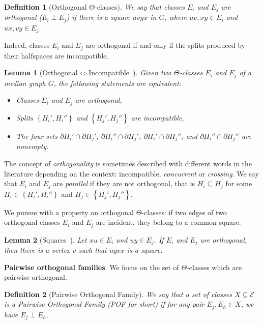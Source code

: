 \documentclass{article}
\newtheorem{definition}{Definition}
\newtheorem{lemma}{Lemma}
\newcommand{\set}[1]{\left\{ #1 \right\}}
\begin{document}
\begin{definition}[Orthogonal $\Theta$-classes]
We say that classes $E_i$ and $E_j$ are {\em orthogonal} ($E_i \perp E_j$) if there is a square $uvyx$ in $G$, where $uv,xy \in E_i$ and $ux,vy \in E_j$.
\end{definition}

Indeed, classes $E_i$ and $E_j$ are orthogonal if and only if the splits produced by their halfspaces are incompatible.

\begin{lemma}[Orthogonal$\Leftrightarrow$Incompatible~\cite{BeHa21}] Given two $\Theta$-classes $E_i$ and $E_j$ of a median graph $G$, the following statements are equivalent:
\begin{itemize}
    \item Classes $E_i$ and $E_j$ are orthogonal,
    \item Splits $\set{H_i',H_i''}$ and $\set{H_j',H_j''}$ are incompatible,
    \item The four sets $\partial H_i' \cap \partial H_j'$, $\partial H_i'' \cap \partial H_j'$, $\partial H_i' \cap \partial H_j''$, and $\partial H_i'' \cap \partial H_j''$ are nonempty.
\end{itemize}
\label{le:perp_incomp}
\end{lemma}

The concept of \textit{orthogonality} is sometimes described with different words in the literature depending on the context: incompatible, \textit{concurrent} or \textit{crossing}. We say that $E_i$ and $E_j$ are \textit{parallel} if they are not orthogonal, that is $H_i \subseteq H_j$ for some $H_i \in \set{H_i',H_i''}$ and $H_j \in \set{H_j',H_j''}$. 

We pursue with a property on orthogonal $\Theta$-classes: if two edges of two orthogonal classes $E_i$ and $E_j$ are incident, they belong to a common square.

\begin{lemma}[Squares~\cite{BaCo93,BeHa21}]
Let $xu \in E_i$ and $uy \in E_j$. If $E_i$ and $E_j$ are orthogonal, then there is a vertex $v$ such that $uyvx$ is a square.
\label{le:squares}
\end{lemma}

\textbf{Pairwise orthogonal families}. We focus on the set of $\Theta$-classes which are pairwise orthogonal.

\begin{definition}[Pairwise Orthogonal Family]
We say that a set of classes $X \subseteq \mathcal{E}$ is a {\em Pairwise Orthogonal Family (POF for short)} if for any pair $E_j,E_h \in X$, we have $E_j \perp E_h$.
\end{definition}
\end{document}
